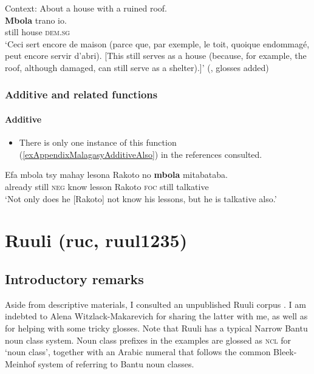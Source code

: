 \begin{exe}
	\ex\label{exAppendixMalagasyMarginal}
	Context: About a house with a ruined roof.\\
	\gll \textbf{Mbola} trano io.\\
	still house \textsc{dem}.\textsc{sg}\\
	\glt \lq Ceci sert encore de maison (parce que, par exemple, le toit, quoique endommagé, peut encore servir d'abri). [This still serves as a house (because, for example, the roof, although damaged, can still serve as a shelter).]' (\cite[128]{Dez1980}, glosses added)
\end{exe}

\subsubsection{Additive and related functions}
\paragraph{Additive}\label{appendixMalagasyAdditive}
\begin{itemize}
	\item There is only one instance of this function (\ref{exAppendixMalagasyAdditiveAlso}) in the references consulted.
\end{itemize}

\begin{exe}
	\ex\label{exAppendixMalagasyAdditiveAlso}
	\gll Efa mbola tsy mahay lesona Rakoto no \textbf{mbola} mitabataba.\\
	already still \textsc{neg} know lesson Rakoto \textsc{foc} still talkative\\
	\glt \lq Not only does he [Rakoto] not know his lessons, but he is talkative also.' \parencite[16]{Rackowski1998}
\end{exe}

\section{Ruuli  (ruc, ruul1235)}\label{appendixRuuli}
\subsection{Introductory remarks}
\begin{sloppypar}
Aside from descriptive materials, I consulted an unpublished Ruuli corpus \parencite{RuuliCorpus}. I am indebted to Alena Witzlack-Makarevich for sharing the latter with me, as well as for helping with some tricky glosses. Note that Ruuli has a typical Narrow Bantu noun class system. Noun class prefixes in the examples are glossed as \textsc{ncl} for \lq noun class', together with an Arabic numeral that follows the common Bleek-Meinhof system of referring to Bantu noun classes.
\end{sloppypar}

